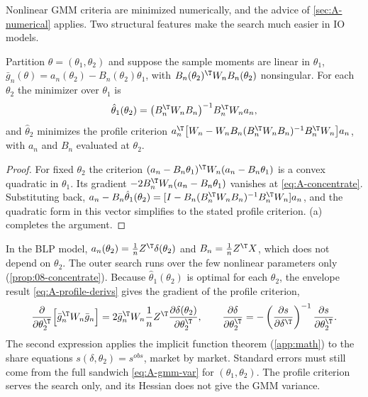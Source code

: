 Nonlinear GMM criteria are minimized numerically, and the advice of \cref{sec:A-numerical} applies. Two structural
features make the search much easier in IO models.

\begin{proposition}\label{prop:A-concentrate-gmm}
Partition $\theta = (\theta_1, \theta_2)$ and suppose the sample moments are linear in $\theta_1$,
$\bar g_n(\theta) = a_n(\theta_2) - B_n(\theta_2)\theta_1$, with $B_n(\theta_2)^\T W_nB_n(\theta_2)$ nonsingular. For each
$\theta_2$ the minimizer over $\theta_1$ is
\begin{equation}\label{eq:A-concentrate}
  \hat\theta_1(\theta_2) = \big(B_n^\T W_nB_n\big)^{-1}B_n^\T W_na_n,
\end{equation}
and $\hat\theta_2$ minimizes the profile criterion $a_n^\T\big[W_n - W_nB_n(B_n^\T W_nB_n)^{-1}B_n^\T W_n\big]a_n$, with
$a_n$ and $B_n$ evaluated at $\theta_2$.
\end{proposition}

\begin{proof}
For fixed $\theta_2$ the criterion $(a_n - B_n\theta_1)^\T W_n(a_n - B_n\theta_1)$ is a convex quadratic in $\theta_1$. Its
gradient $-2B_n^\T W_n(a_n - B_n\theta_1)$ vanishes at \eqref{eq:A-concentrate}. Substituting back,
$a_n - B_n\hat\theta_1(\theta_2) = [I - B_n(B_n^\T W_nB_n)^{-1}B_n^\T W_n]a_n$, and the quadratic form in this vector
simplifies to the stated profile criterion. (a) completes the argument.
\end{proof}

In the BLP model, $a_n(\theta_2) = \frac{1}{n}Z^\T\delta(\theta_2)$ and $B_n = \frac{1}{n}Z^\T X$, which does not depend on
$\theta_2$. The outer search runs over the few nonlinear parameters only (\cref{prop:08-concentrate}). Because
$\hat\theta_1(\theta_2)$ is optimal for each $\theta_2$, the envelope result \eqref{eq:A-profile-derivs} gives the gradient
of the profile criterion,
\begin{equation*}
  \frac{\partial}{\partial\theta_2^\T}\Big[\bar g_n^\T W_n\bar g_n\Big] = 2\bar g_n^\T W_n\frac{1}{n}Z^\T
  \frac{\partial\delta(\theta_2)}{\partial\theta_2^\T},
  \qquad
  \frac{\partial\delta}{\partial\theta_2^\T} = -\left(\frac{\partial s}{\partial\delta^\T}\right)^{-1}
  \frac{\partial s}{\partial\theta_2^\T}.
\end{equation*}
The second expression applies the implicit function theorem (\cref{app:math}) to the share equations
$s(\delta, \theta_2) = s^{\mathit{obs}}$, market by market. Standard errors must still come from the full sandwich
\eqref{eq:A-gmm-var} for $(\theta_1, \theta_2)$. The profile criterion serves the search only, and its Hessian does
not give the GMM variance.

